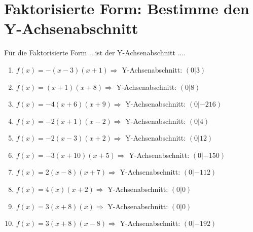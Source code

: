 \documentclass{article}%
\begin{document}
%
\section{Faktorisierte Form: Bestimme den Y{-}Achsenabschnitt}%
\label{sec:FaktorisierteFormBestimmedenY{-}Achsenabschnitt}%
Für die Faktorisierte Form ...ist der Y{-}Achsenabschnitt ....%
\begin{enumerate}[label=\alph*)]%
\item%
\newline\vspace{0.5cm}$f(x)=-(x-3)(x+1) \Rightarrow $ Y-Achsenabschnitt: $ (0|3) $%
\item%
\newline\vspace{0.5cm}$f(x)=(x+1)(x+8) \Rightarrow $ Y-Achsenabschnitt: $ (0|8) $%
\item%
\newline\vspace{0.5cm}$f(x)=-4(x+6)(x+9) \Rightarrow $ Y-Achsenabschnitt: $ (0|-216) $%
\item%
\newline\vspace{0.5cm}$f(x)=-2(x+1)(x-2) \Rightarrow $ Y-Achsenabschnitt: $ (0|4) $%
\item%
\newline\vspace{0.5cm}$f(x)=-2(x-3)(x+2) \Rightarrow $ Y-Achsenabschnitt: $ (0|12) $%
\item%
\newline\vspace{0.5cm}$f(x)=-3(x+10)(x+5) \Rightarrow $ Y-Achsenabschnitt: $ (0|-150) $%
\item%
\newline\vspace{0.5cm}$f(x)=2(x-8)(x+7) \Rightarrow $ Y-Achsenabschnitt: $ (0|-112) $%
\item%
\newline\vspace{0.5cm}$f(x)=4(x)(x+2) \Rightarrow $ Y-Achsenabschnitt: $ (0|0) $%
\item%
\newline\vspace{0.5cm}$f(x)=3(x+8)(x) \Rightarrow $ Y-Achsenabschnitt: $ (0|0) $%
\item%
\newline\vspace{0.5cm}$f(x)=3(x+8)(x-8) \Rightarrow $ Y-Achsenabschnitt: $ (0|-192) $%
\end{enumerate}
\end{document}
